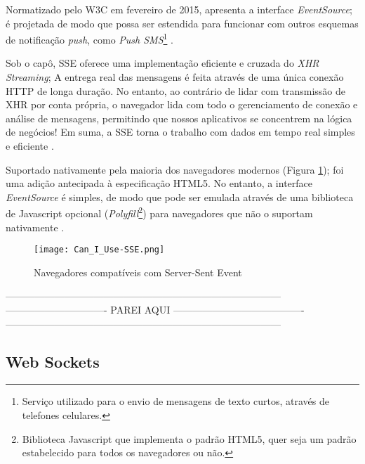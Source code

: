 Normatizado pelo W3C em fevereiro de 2015, apresenta a interface \emph{EventSource}; é projetada de modo que possa ser estendida para funcionar com outros esquemas de notificação \emph{push}, como \emph{Push SMS}\footnote{Serviço utilizado para o envio de mensagens de texto curtos, através de telefones celulares.} \cite{hicksonserver2015}.

\begin{citacao}
	Sob o capô, SSE oferece uma implementação eficiente e cruzada do \emph{XHR Streaming}; A entrega real das mensagens é feita através de uma única conexão HTTP de longa duração. No entanto, ao contrário de lidar com transmissão de XHR por conta própria, o navegador lida com todo o gerenciamento de conexão e análise de mensagens, permitindo que nossos aplicativos se concentrem na lógica de negócios! Em suma, a SSE torna o trabalho com dados em tempo real simples e eficiente \cite[P.~279]{grigorik2013high}.
\end{citacao}

Suportado nativamente pela maioria dos navegadores modernos (Figura \ref{fig:sse}); foi uma adição antecipada à especificação HTML5. No entanto, a interface \emph{EventSource} é simples, de modo que pode ser emulada através de uma biblioteca de Javascript opcional (\emph{Polyfill}\footnote{Biblioteca Javascript que implementa o padrão HTML5, quer seja um padrão estabelecido para todos os navegadores ou não.}) para navegadores que não o suportam nativamente \cite{grigorik2013high}.

\begin{figure}[!htb]
	\centering
	\texttt{[image: Can\_I\_Use-SSE.png]}
	\caption{Navegadores compatíveis com Server-Sent Event}
	\label{fig:sse}
\end{figure}

------------------------------------------------------------------------------------
------------------------------- PAREI AQUI ----------------------------------------
------------------------------------------------------------------------------------

\subsection{Web Sockets}

